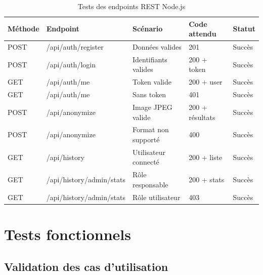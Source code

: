 \begin{table}[H]
\centering
\caption{Tests des endpoints REST Node.js}
\label{tab:tests_api}
\begin{tabularx}{\textwidth}{p{1.5cm} p{4cm} p{2.5cm} p{2cm} p{1.2cm}}
\toprule
\textbf{Méthode} & \textbf{Endpoint} & \textbf{Scénario} & \textbf{Code attendu} & \textbf{Statut} \\
\midrule
POST & /api/auth/register   & Données valides      & 201 & \textcolor{green!60!black}{Succès} \\
POST & /api/auth/login      & Identifiants valides & 200 + token & \textcolor{green!60!black}{Succès} \\
GET  & /api/auth/me         & Token valide         & 200 + user & \textcolor{green!60!black}{Succès} \\
GET  & /api/auth/me         & Sans token           & 401 & \textcolor{green!60!black}{Succès} \\
POST & /api/anonymize       & Image JPEG valide    & 200 + résultats & \textcolor{green!60!black}{Succès} \\
POST & /api/anonymize       & Format non supporté  & 400 & \textcolor{green!60!black}{Succès} \\
GET  & /api/history         & Utilisateur connecté & 200 + liste & \textcolor{green!60!black}{Succès} \\
GET  & /api/history/admin/stats & Rôle responsable  & 200 + stats & \textcolor{green!60!black}{Succès} \\
GET  & /api/history/admin/stats & Rôle utilisateur   & 403 & \textcolor{green!60!black}{Succès} \\
\bottomrule
\end{tabularx}
\end{table}

\section{Tests fonctionnels}

\subsection{Validation des cas d'utilisation}

